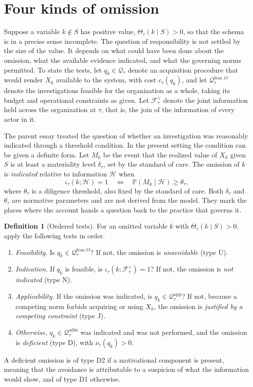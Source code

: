 \documentclass[11pt]{article}
\newcommand{\F}{\mathcal F}
\newcommand{\Q}{\mathcal Q}
\newcommand{\PP}{\mathbb P}
\newcommand{\feas}{\mathrm{feas}}
\newcommand{\adm}{\mathrm{adm}}
\newcommand{\app}{\mathrm{app}}
\newcommand{\Th}{\Theta}
\theoremstyle{plain}
\theoremstyle{definition}
\newtheorem{definition}{Definition}
\begin{document}
\section{Four kinds of omission}

Suppose a variable $k\notin S$ has positive value, $\Th_\tau(k\mid S)>0$, so that the schema is in a precise sense incomplete. The question of responsibility is not settled by the size of the value. It depends on what could have been done about the omission, what the available evidence indicated, and what the governing norms permitted. To state the tests, let $q_k\in\Q_\tau$ denote an acquisition procedure that would render $X_k$ available to the system, with cost $c_\tau(q_k)$, and let $\Q_\tau^{\feas,O}$ denote the investigations feasible for the organization as a whole, taking its budget and operational constraints as given. Let $\F^{\vee}_\tau$ denote the joint information held across the organization at $\tau$, that is, the join of the information of every actor in it.

The parent essay treated the question of whether an investigation was reasonably indicated through a threshold condition. In the present setting the condition can be given a definite form. Let $M_k$ be the event that the realized value of $X_k$ given $S$ is at least a materiality level $\delta_\tau$, set by the standard of care. The omission of $k$ is \emph{indicated} relative to information $\mathcal H$ when
\[
\iota_\tau(k;\mathcal H)=1\quad\Longleftrightarrow\quad \PP(M_k\mid\mathcal H)\ge\theta_\tau ,
\]
where $\theta_\tau$ is a diligence threshold, also fixed by the standard of care. Both $\delta_\tau$ and $\theta_\tau$ are normative parameters and are not derived from the model. They mark the places where the account hands a question back to the practice that governs it.

\begin{definition}[Ordered tests]
For an omitted variable $k$ with $\Th_\tau(k\mid S)>0$, apply the following tests in order.
\begin{enumerate}[label=T\arabic*., leftmargin=2.2em, itemsep=0.1em]
\item \emph{Feasibility.} Is $q_k\in\Q_\tau^{\feas,O}$? If not, the omission is \emph{unavoidable} (type U).
\item \emph{Indication.} If $q_k$ is feasible, is $\iota_\tau(k;\F^{\vee}_\tau)=1$? If not, the omission is \emph{not indicated} (type N).
\item \emph{Applicability.} If the omission was indicated, is $q_k\in\Q_\tau^{\app}$? If not, because a competing norm forbids acquiring or using $X_k$, the omission is \emph{justified by a competing constraint} (type J).
\item \emph{Otherwise,} $q_k\in\Q_\tau^{\adm}$ was indicated and was not performed, and the omission is \emph{deficient} (type D), with $\nu_\tau(q_k)>0$.
\end{enumerate}
A deficient omission is of type D2 if a motivational component is present, meaning that the avoidance is attributable to a suspicion of what the information would show, and of type D1 otherwise.
\end{definition}
\end{document}
